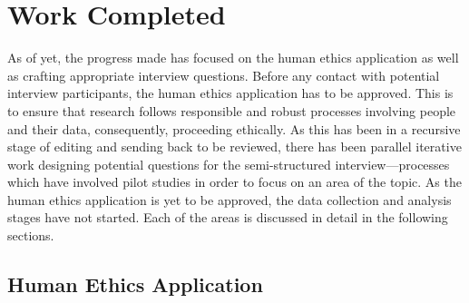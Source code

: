 \chapter{Work Completed}\label{C:Completed}

\par As of yet, the progress made has focused on the human ethics application as well as crafting appropriate interview questions. Before any contact with potential interview participants, the human ethics application has to be approved. This is to ensure that research follows responsible and robust processes involving people and their data, consequently, proceeding ethically. As this has been in a recursive stage of editing and sending back to be reviewed, there has been parallel iterative work designing potential questions for the semi-structured interview—processes which have involved pilot studies in order to focus on an area of the topic. As the human ethics application is yet to be approved, the data collection and analysis stages have not started. Each of the areas is discussed in detail in the following sections. 

\section{Human Ethics Application}

